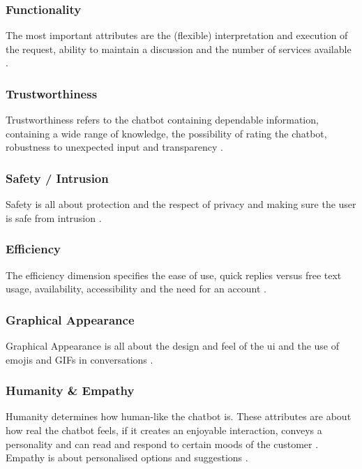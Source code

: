 \subsubsection{Functionality}
The most important attributes are the (flexible) interpretation and execution of the request, ability to maintain a discussion and the number of services available \citep*{Muizzah2021, Verkeyn2018}.

\subsubsection{Trustworthiness}
Trustworthiness refers to the chatbot containing dependable information, containing a wide range of knowledge, the possibility of rating the chatbot, robustness to unexpected input and transparency \citep*{Muizzah2021, Verkeyn2018}.

\subsubsection{Safety / Intrusion}
Safety is all about protection and the respect of privacy and making sure the user is safe from intrusion \citep*{Muizzah2021, Verkeyn2018}.

\subsubsection{Efficiency}
The efficiency dimension specifies the ease of use, quick replies versus free text usage, availability, accessibility and the need for an account \citep*{Muizzah2021, Verkeyn2018}.

\subsubsection{Graphical Appearance}
Graphical Appearance is all about the design and feel of the \acrshort{ui} and the use of emojis and GIFs in conversations \citep*{Muizzah2021, Verkeyn2018}.

\subsubsection{Humanity \& Empathy}
Humanity determines how human-like the chatbot is. These attributes are about how real the chatbot feels, if it creates an enjoyable interaction, conveys a personality and can read and respond to certain moods of the customer \citep*{Muizzah2021, Verkeyn2018}.\\
Empathy is about personalised options and suggestions \citep*{Muizzah2021, Verkeyn2018}.

